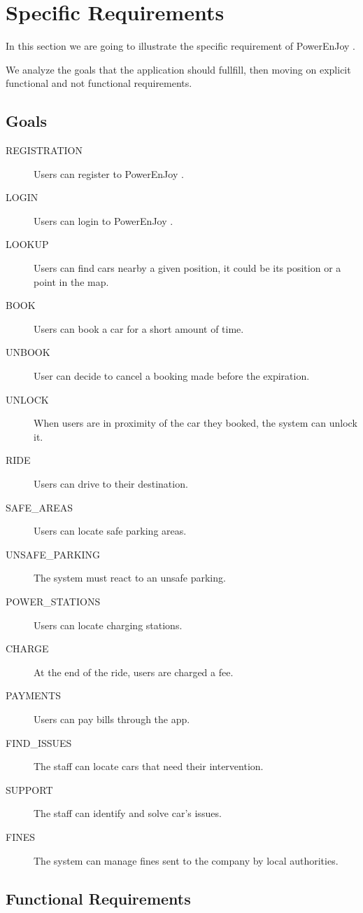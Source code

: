 \documentclass[11pt]{article} %
\newcommand{\pe}{PowerEnJoy }
\begin{document}
\newpage

\section{Specific Requirements}

In this section we are going to illustrate the specific requirement of \pe.

We analyze the goals that the application should fullfill, then moving on explicit functional and not functional requirements.

 \subsection{Goals}

 \begin{description}
 	\item[REGISTRATION] Users can register to \pe.
	\item[LOGIN] Users can login to \pe.
 	\item[LOOKUP] Users can find cars nearby a given position, it could be its position or a point in the map.
 	\item[BOOK] Users can book a car for a short amount of time.
 	\item[UNBOOK] User can decide to cancel a booking made before the expiration.
 	\item[UNLOCK] When users are in proximity of the car they booked, the system can unlock it.
	\item[RIDE] Users can drive to their destination.
	\item[SAFE\_AREAS] Users can locate safe parking areas.
	\item[UNSAFE\_PARKING] The system must react to an unsafe parking.
	\item[POWER\_STATIONS] Users can locate charging stations.
	\item[CHARGE] At the end of the ride, users are charged a fee.
	\item[PAYMENTS] Users can pay bills through the app.
	\item[FIND\_ISSUES] The staff can locate cars that need their intervention.
	\item[SUPPORT] The staff can identify and solve car's issues.
	\item[FINES] The system can manage fines sent to the company by local authorities.
 \end{description}


\subsection{Functional Requirements}
\end{document}
